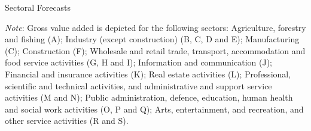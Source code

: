 \documentclass[9pt]{beamer}
\begin{document}
\begin{frame}{Sectoral Forecasts}
    \begin{table}[!h]

	\caption{Out-of-sample forecast performance of sectoral gross value added (GVA)} 
	\label{table:rmse_abm_nace10}
	\centering
	\begin{tablenotes}
		\footnotesize \item \textit{Note}: Gross value added is depicted for the following sectors: Agriculture, forestry and fishing (A); Industry (except construction) (B, C, D and E); Manufacturing (C); Construction (F); Wholesale and retail trade, transport, accommodation and food service activities (G, H and I); Information and communication (J); Financial and insurance activities (K); Real estate activities (L); Professional, scientific and technical activities, and administrative and support service activities (M and N); Public administration, defence, education, human health and social work activities (O, P and Q); Arts, entertainment, and recreation, and other service activities (R and S).
	\end{tablenotes}
\end{table}
\label{ForecastTableSectors}
\hyperlink{ForecastTableSectorsReturn}{}
\end{frame}
\end{document}
